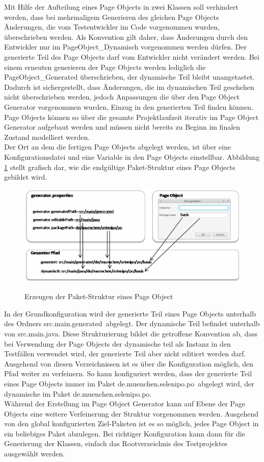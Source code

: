 Mit Hilfe der Aufteilung eines Page Objects in zwei Klassen soll verhindert werden, dass bei mehrmaligem Generieren des gleichen Page Objects Änderungen, die vom Testentwickler im Code vorgenommen wurden, überschrieben werden. Als Konvention gilt daher, dass Änderungen durch den Entwickler nur im PageObject\_Dynamisch vorgenommen werden dürfen. Der generierte Teil des Page Objects darf vom Entwickler nicht verändert werden.
Bei einem erneuten generieren der Page Objects werden lediglich die PageObject\_Generated überschrieben, der dynamische Teil bleibt unangetastet.
Dadurch ist sichergestellt, dass Änderungen, die im dynamischen Teil geschehen nicht überschrieben werden, jedoch Anpassungen die über den Page Object Generator vorgenommen wurden, Einzug in den generierten Teil finden können.
Page Objects können so über die gesamte Projektlaufzeit iterativ im Page Object Generator aufgebaut werden und müssen nicht bereits zu Beginn im finalen Zustand modelliert werden.\\
Der Ort an dem die fertigen Page Objects abgelegt werden, ist über eine Konfigurationsdatei und eine Variable in den Page Objects einstellbar. 
Abbildung \ref{fig:packagepath} stellt grafisch dar, wie die endgültige Paket-Struktur eines Page Objects gebildet wird.
\begin{figure}[htb]
  \centering  
  \includegraphics[scale=0.8]{img/packagePath.png}\\
  \caption{Erzeugen der Paket-Struktur eines Page Object}
  \label{fig:packagepath}
\end{figure}
In der Grundkonfiguration wird der generierte Teil eines Page Objects unterhalb des Ordners \grq src.main.generated\grq\ abgelegt. Der dynamische Teil befindet unterhalb von \grq src.main.java\grq.
Diese Strukturierung bildet die getroffene Konvention ab, dass bei Verwendung der Page Objects der dynamische teil als Instanz in den Testfällen verwendet wird, der generierte Teil aber nicht editiert werden darf.
Ausgehend von diesen Verzeichnissen ist es über die Konfiguration möglich, den Pfad weiter zu verfeinern. So kann konfiguriert werden, dass der generierte Teil eines Page Objects immer im Paket \grq de.muenchen.selenipo.po\grq\ abgelegt wird, der dynamische im Paket \grq de.muenchen.selenipo.po\grq.\\
Während der Erstellung im Page Object Generator kann auf Ebene der Page Objects eine weitere Verfeinerung der Struktur vorgenommen werden. Ausgehend von den global konfigurierten Ziel-Paketen ist es so möglich, jedes Page Object in ein beliebiges Paket abzulegen.
Bei richtiger Konfiguration kann dann für die Generierung der Klassen, einfach das Rootverzeichnis des Testprojektes ausgewählt werden.

